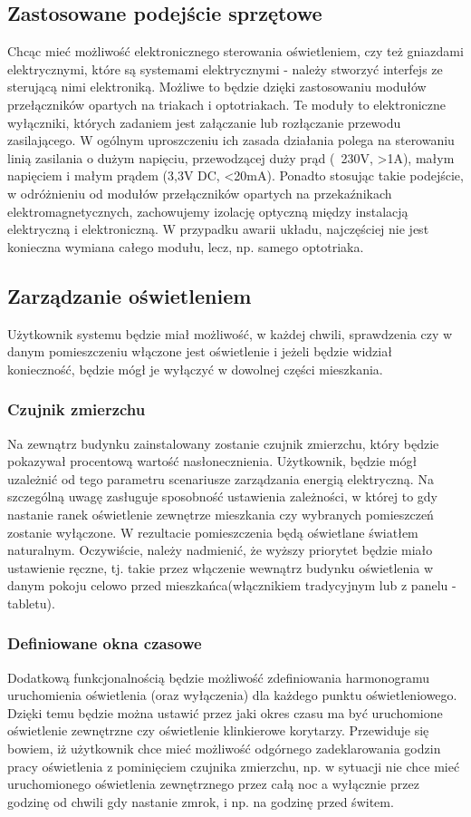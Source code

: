 \documentclass[12pt]{article} %
\begin{document}
\subsection{Zastosowane podejście sprzętowe}
Chcąc mieć możliwość elektronicznego sterowania oświetleniem, czy też gniazdami elektrycznymi, które są systemami elektrycznymi - należy stworzyć interfejs ze sterującą nimi elektroniką. Możliwe to będzie dzięki zastosowaniu modułów przełączników opartych na triakach i optotriakach. Te moduły to elektroniczne wyłączniki, których zadaniem jest załączanie lub rozłączanie przewodu zasilającego. W ogólnym uproszczeniu ich zasada działania polega na sterowaniu linią zasilania o dużym napięciu, przewodzącej duży prąd (~230V, >1A), małym napięciem i małym prądem (3,3V DC, <20mA). Ponadto stosując takie podejście, w odróżnieniu od modułów przełączników opartych na przekaźnikach elektromagnetycznych, zachowujemy izolację optyczną między instalacją elektryczną i elektroniczną. W przypadku awarii układu, najczęściej nie jest konieczna wymiana całego modułu, lecz, np. samego optotriaka.

\subsection{Zarządzanie oświetleniem}
Użytkownik systemu będzie miał możliwość, w każdej chwili, sprawdzenia czy w danym pomieszczeniu włączone jest oświetlenie i jeżeli będzie widział konieczność, będzie mógł je wyłączyć w dowolnej części mieszkania.
\subsubsection{Czujnik zmierzchu}
Na zewnątrz budynku zainstalowany zostanie czujnik zmierzchu, który będzie pokazywał procentową wartość nasłonecznienia. Użytkownik, będzie mógł uzależnić od tego parametru scenariusze zarządzania energią elektryczną. Na szczególną uwagę zasługuje sposobność ustawienia zależności, w której to gdy nastanie ranek oświetlenie zewnętrze mieszkania czy wybranych pomieszczeń zostanie wyłączone. W rezultacie pomieszczenia będą oświetlane światłem naturalnym. Oczywiście, należy nadmienić, że wyższy priorytet będzie miało ustawienie ręczne, tj. takie przez włączenie wewnątrz budynku oświetlenia w danym pokoju celowo przed mieszkańca(włącznikiem tradycyjnym lub z panelu - tabletu).

\subsubsection{Definiowane okna czasowe}
Dodatkową funkcjonalnością będzie możliwość zdefiniowania harmonogramu uruchomienia oświetlenia (oraz wyłączenia) dla każdego punktu oświetleniowego. Dzięki temu będzie można ustawić przez jaki okres czasu ma być uruchomione oświetlenie zewnętrzne czy oświetlenie klinkierowe korytarzy. Przewiduje się bowiem, iż użytkownik chce mieć możliwość odgórnego zadeklarowania godzin pracy oświetlenia z pominięciem czujnika zmierzchu, np. w sytuacji nie chce mieć uruchomionego oświetlenia zewnętrznego przez całą noc a wyłącznie przez godzinę od chwili gdy nastanie zmrok, i np. na godzinę przed świtem.
\end{document}
